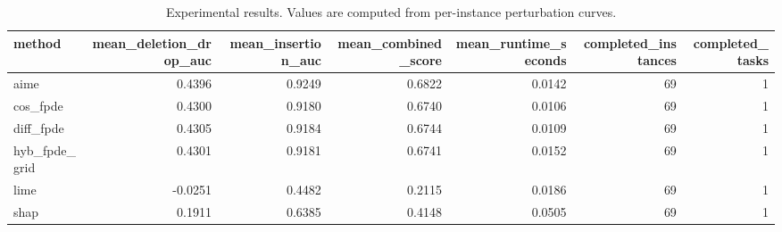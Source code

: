 \begin{table}[t]
\caption{Experimental results. Values are computed from per-instance perturbation curves.}
\label{tab:main_results_computed}
\centering
\begin{tabular}{lrrrrrr}
\toprule
method & mean\_deletion\_drop\_auc & mean\_insertion\_auc & mean\_combined\_score & mean\_runtime\_seconds & completed\_instances & completed\_tasks \\
\midrule
aime & 0.4396 & 0.9249 & 0.6822 & 0.0142 & 69 & 1 \\
cos\_fpde & 0.4300 & 0.9180 & 0.6740 & 0.0106 & 69 & 1 \\
diff\_fpde & 0.4305 & 0.9184 & 0.6744 & 0.0109 & 69 & 1 \\
hyb\_fpde\_grid & 0.4301 & 0.9181 & 0.6741 & 0.0152 & 69 & 1 \\
lime & -0.0251 & 0.4482 & 0.2115 & 0.0186 & 69 & 1 \\
shap & 0.1911 & 0.6385 & 0.4148 & 0.0505 & 69 & 1 \\
\bottomrule
\end{tabular}

\end{table}
